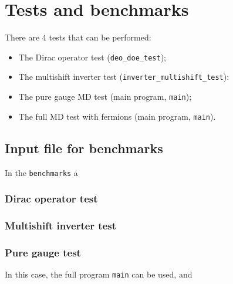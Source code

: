 
\chapter{Tests and benchmarks}

There are 4 tests that can be performed:
\begin{itemize}
 \item The Dirac operator test (\verb|deo_doe_test|);
 \item The multishift inverter test (\verb|inverter_multishift_test|):
 \item The pure gauge MD test (main program, \verb|main|);
 \item The full MD test with fermions (main program, \verb|main|).
\end{itemize}


\section{Input file for benchmarks}
In the \verb|benchmarks| a 


\subsection{Dirac operator test}


\subsection{Multishift inverter test}


\subsection{Pure gauge test}

In this case, the full program \verb|main| can be used, and 


